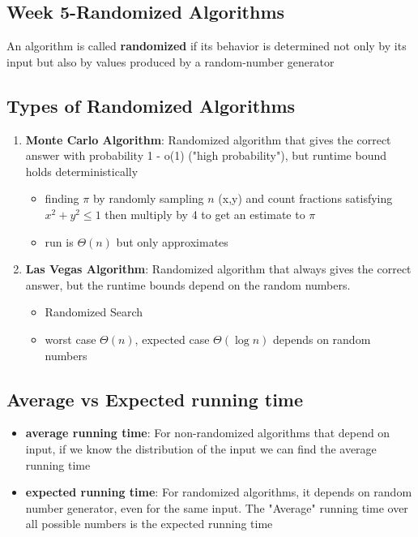 \documentclass{article}
\begin{document}
\begin{multicols*}{4}
\section{Week 5-Randomized Algorithms}
An algorithm is called \textbf{randomized} if its behavior is determined not only by its input but also by values produced by a random-number generator
\subsection{Types of Randomized Algorithms}
\begin{enumerate}
	\item \textbf{Monte Carlo Algorithm}: Randomized algorithm that gives the correct answer with probability 1 - o(1) ("high probability"), but runtime bound holds deterministically
	\begin{itemize}
		\item finding $\pi$ by randomly sampling $n$ (x,y) and count fractions satisfying $x^2+y^2\leq1$ then multiply by 4 to get an estimate to $\pi$
		\item run is $\Theta(n)$ but only approximates %
	\end{itemize}
	\item \textbf{Las Vegas Algorithm}: Randomized algorithm that always gives the correct answer, but the runtime bounds depend on the random numbers.
	\begin{itemize}
		\item Randomized Search
		\item worst case $\Theta(n)$, expected case $\Theta(\log n)$ depends on random numbers
	\end{itemize}
\end{enumerate}

\subsection{Average vs Expected running time}
\begin{itemize}
	\item \textbf{average running time}: For non-randomized algorithms that depend on input, if we know the distribution of the input we can find the average running time
	\item \textbf{expected running time}: For randomized algorithms, it depends on random number generator, even for the same input. The "Average" running time over all possible numbers is the expected running time
\end{itemize}


\end{multicols*}
\end{document}
